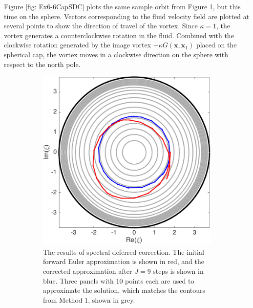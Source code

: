 \documentclass{sfuthesis}
\begin{document}
Figure \ref{fig: Ex6-6CapSDC} plots the same sample orbit from Figure \ref{fig: Ex6-6CapSDCStereo}, but this time on the sphere. Vectors corresponding to the fluid velocity field are plotted at several points to show the direction of travel of the vortex. Since $\kappa=1$, the vortex generates a counterclockwise rotation in the fluid. Combined with the clockwise rotation generated by the image vortex $-\kappa G(\mathbf{x}, \mathbf{x}_1)$ placed on the spherical cap, the vortex moves in a clockwise direction on the sphere with respect to the north pole. 

 \begin{figure}[h]
 	\centering
    	\begin{subfigure}[c]{0.47\textwidth}
 		\includegraphics[width=\textwidth]{Ex6-6CapSDCStereo}
		\caption{The results of spectral deferred correction. The initial forward Euler approximation is shown in red, and the corrected approximation after $J=9$ steps is shown in blue. Three panels with 10 points each are used to approximate the solution, which matches the contours from Method 1, shown in grey.}
		\label{fig: Ex6-6CapSDCStereo}
	\end{subfigure} \hspace{0.3cm}
	\begin{subfigure}[c]{0.44\textwidth}

\end{subfigure}
\end{figure}
\end{document}
